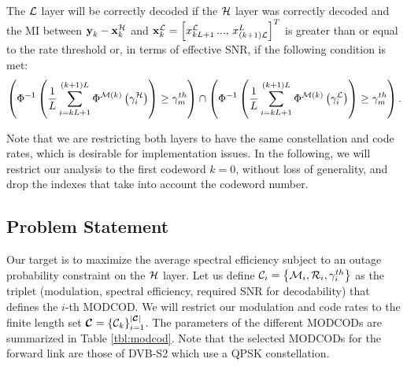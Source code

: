 \documentclass[journal,onecolumn,10pt,a4paper]{IEEEtran}
\begin{document}
The ${\cal L}$ layer will be correctly decoded if the ${\cal H}$ layer was correctly decoded and the MI between $\boldsymbol{\mathbf{y}}_k - \boldsymbol{\mathbf{x}}^{\cal H}_k$ and $\boldsymbol{\mathbf{x}}^{\cal L}_k = \left[x_{kL+1}^{\cal L}\,...,\, x_{(k+1){\cal L}}^L \right]^T$ is greater than or equal to the rate threshold or, in terms of effective SNR, if the following condition is met:
\begin{equation}
 \left(\Phi^{-1}\left(\frac{1}{L}\sum_{i={kL+1}}^{(k+1)L} \Phi^{{\cal M}(k)} \left(\gamma_i^{\cal H} \right)\right) \geq \gamma_{m}^{th} \right) \cap  \left(\Phi^{-1}\left(\frac{1}{L}\sum_{i={kL+1}}^{(k+1)L} \Phi^{{\cal M}(k)} \left(\gamma_i^{\cal L} \right)\right)  \geq \gamma_{m}^{th} \right).
\end{equation}

Note that we are restricting both layers to have the same constellation and code rates, which is desirable for implementation issues. In the following, we will restrict our analysis to the first codeword $k=0$, without loss of generality, and drop the indexes that take into account the codeword number.

\subsection{Problem Statement}

Our target is to maximize the average spectral efficiency subject to an outage probability constraint on the ${\cal H}$ layer. Let us define ${\cal C}_i = \left\{ {\cal M}_i, {\cal R}_i, {\gamma}_i^{th}\right\}$ as the triplet (modulation, spectral efficiency, required SNR for decodability) that defines the $i$-th MODCOD. We will restrict our modulation and code rates to the finite length set $\boldsymbol{\mathbf{\cal C}} = \left\{ {\cal C}_k \right\}_{i=1}^{|\boldsymbol{\mathbf{\cal C}}|}$. The parameters of the different MODCODs are summarized in Table \ref{tbl:modcod}. Note that the selected MODCODs for the forward link are those of DVB-S2 which use a QPSK constellation.
\end{document}
